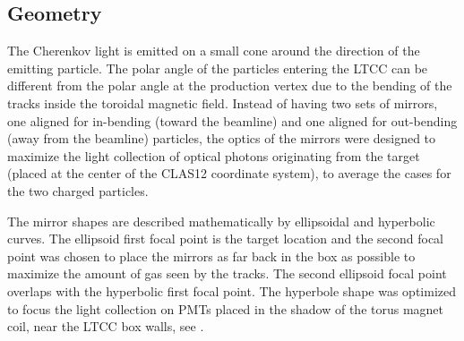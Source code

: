 \subsection{Geometry}

The Cherenkov light is emitted on a small cone around the direction of the emitting particle. The polar angle of
the particles entering the LTCC can be different from the polar angle at the production vertex due
to the bending of the tracks inside the toroidal magnetic field.
Instead of having two sets of mirrors, one aligned for in-bending (toward the beamline) and one aligned for
out-bending (away from the beamline) particles, the optics of the mirrors were designed to maximize the
light collection of optical photons originating from the target (placed at the center of the CLAS12 coordinate system),
to average the cases for the two charged particles.

The mirror shapes are described mathematically by ellipsoidal and hyperbolic curves.
The ellipsoid first focal point is the target location and the second focal point was chosen
to place the mirrors as far back in the box as possible to maximize the amount of gas seen by the tracks.
The second ellipsoid focal point overlaps with the hyperbolic first focal point. The hyperbole shape was optimized to
focus the light collection on PMTs placed in the shadow of the torus magnet coil, near the LTCC box walls,
see .

